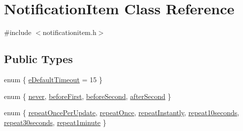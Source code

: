 \hypertarget{class_notification_item}{\section{\-Notification\-Item \-Class \-Reference}
\label{class_notification_item}
}


{\ttfamily \#include $<$notificationitem.\-h$>$}

\subsection*{\-Public \-Types}
\begin{DoxyCompactItemize}
\item 
enum \{ \hyperlink{group___notify_plugin_ggae19b5277b68bb273f1a0225e41255ccea8fee5829d0108684543cf01a53af668f}{e\-Default\-Timeout} =  15
 \}
\item 
enum \{ \hyperlink{group___notify_plugin_gga9cd2611b6dc62949c93abb5b82ad0ec3a908fb8bab8f2e2e5aae18d53fe643c1e}{never}, 
\hyperlink{group___notify_plugin_gga9cd2611b6dc62949c93abb5b82ad0ec3af3a07edb74d1ab9b39fd6db3b1d6ad00}{before\-First}, 
\hyperlink{group___notify_plugin_gga9cd2611b6dc62949c93abb5b82ad0ec3ac0e140c5209cc791f99fc19ddf8fe6f0}{before\-Second}, 
\hyperlink{group___notify_plugin_gga9cd2611b6dc62949c93abb5b82ad0ec3a95117a3c7ab2e169b43a3121a329a43a}{after\-Second}
 \}
\item 
enum \{ \*
\hyperlink{group___notify_plugin_ggac4b5f5f84172cf5ac9e09f3a683f3ebba1a55bc3c686d15eb1e9d010b7a07a50a}{repeat\-Once\-Per\-Update}, 
\hyperlink{group___notify_plugin_ggac4b5f5f84172cf5ac9e09f3a683f3ebba13280fe30c3bd30abf86825b504b6ec7}{repeat\-Once}, 
\hyperlink{group___notify_plugin_ggac4b5f5f84172cf5ac9e09f3a683f3ebba49596c4af726c4fb52dbfe7df33c7178}{repeat\-Instantly}, 
\hyperlink{group___notify_plugin_ggac4b5f5f84172cf5ac9e09f3a683f3ebbac3e73d8efe76007eeca66f2cfb609075}{repeat10seconds}, 
\*
\hyperlink{group___notify_plugin_ggac4b5f5f84172cf5ac9e09f3a683f3ebba18a34ac252d2f02c618ee1a4aae6ce9e}{repeat30seconds}, 
\hyperlink{group___notify_plugin_ggac4b5f5f84172cf5ac9e09f3a683f3ebba014d745bf7f8943763a58f8c55d5891b}{repeat1minute}
 \}
\end{DoxyCompactItemize}
